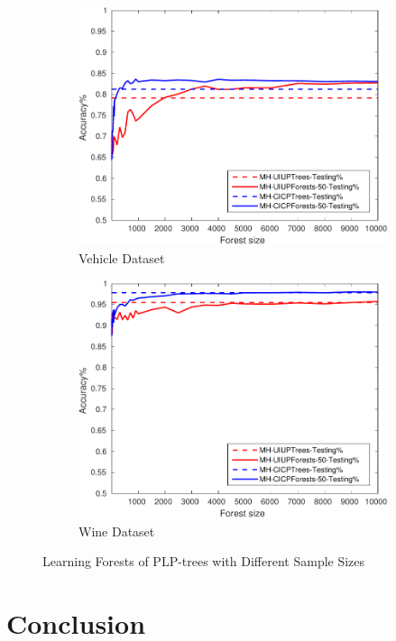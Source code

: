\begin{figure}[ht]
\begin{subfigure}[b]{0.3\textwidth}
  	\includegraphics[width=\textwidth]{figs/PLPTF/Forests/VehicleDownsampledFurther_Forests_MH.pdf}
  	\caption{Vehicle Dataset}
		\label{fig:V4}
	\end{subfigure}
  \begin{subfigure}[b]{0.3\textwidth}
		\centering
  	\includegraphics[width=\textwidth]{figs/PLPTF/Forests/WineDownsampled_Forests_MH.pdf}
  	\caption{Wine Dataset}
		\label{fig:W4}
	\end{subfigure}

  \caption{Learning Forests of PLP-trees with Different Sample Sizes}
  \label{fig:forests2}
\end{figure}


\section{Conclusion}

